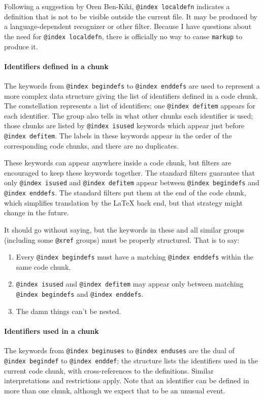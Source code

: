 \documentclass{article}
\makeatletter
\newcommand\kw[1]{\texttt{@#1}}
\newcommand\ikw[1]{\kw{index~#1}}
\makeatother
\begin{document}
Following a suggestion by Oren Ben-Kiki,
\ikw{localdefn} indicates a definition that is not to be visible
outside the current file.
It may be produced by a language-dependent recognizer or other filter.
Because I have questions about the need for \ikw{localdefn}, there is
officially no way to cause {\tt markup} to produce it.

\paragraph{Identifiers defined in a chunk}

The keywords from \ikw{begindefs} to \ikw{enddefs} are used to represent
a more complex data structure giving the list of identifiers defined
in a code chunk.
The constellation represents a list of identifiers; one \ikw{defitem}
appears for each identifier.
The group also tells in what other chunks each identifier is used;
those chunks are listed by \ikw{isused} keywords which appear just
before \ikw{defitem}.
The labels in these keywords appear in the order of the corresponding
code chunks, and there are no duplicates.

These keywords can appear anywhere inside a code chunk, but
filters are encouraged to keep these keywords together.
The standard
filters guarantee that only
\ikw{isused} and \ikw{defitem} appear between \ikw{begindefs} and
\ikw{enddefs}.
The standard filters put them at the end of the code chunk, which
simplifies translation by the {\LaTeX} back end, but that strategy
might change in the future.


It should go without saying, but the keywords in these and all similar
groups (including some \kw{xref} groups) must be properly structured.
That is to say:
\begin{enumerate}
\item
Every \ikw{begindefs} must have a matching \ikw{enddefs} within the
same code chunk.
\item
\ikw{isused} and \ikw{defitem} may appear only between matching
\ikw{begindefs} and \ikw{enddefs}.
\item
The damn things can't be nested.
\end{enumerate}


\paragraph{Identifiers used in a chunk}


The keywords from \ikw{beginuses} to \ikw{enduses} are the dual of
\ikw{begindef} to \ikw{enddef};
the structure lists the identifiers used in the current code chunk,
with cross-references to the definitions.
Similar interpretations and restrictions apply.
Note that an identifier can be defined in more than one chunk,
although we expect that to be an unusual event.
{\hfuzz=1.2pt\par}
\end{document}
